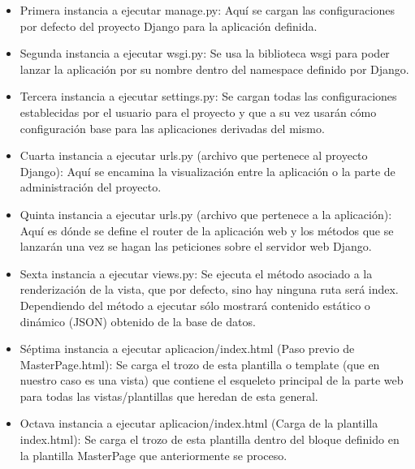 \begin{itemize}
\item Primera instancia a ejecutar manage.py: Aquí se cargan las configuraciones por defecto del proyecto Django para la aplicación definida.
\item Segunda instancia a ejecutar wsgi.py: Se usa la biblioteca wsgi para poder lanzar la aplicación por su nombre dentro del namespace definido por Django.
\item Tercera instancia a ejecutar settings.py: Se cargan todas las configuraciones establecidas por el usuario para el proyecto y que a su vez usarán cómo configuración base para las aplicaciones derivadas del mismo.
\item Cuarta instancia a ejecutar urls.py (archivo que pertenece al proyecto Django): Aquí se encamina la visualización entre la aplicación o la parte de administración del proyecto.
\item Quinta instancia a ejecutar urls.py (archivo que pertenece a la aplicación): Aquí es dónde se define el router de la aplicación web y los métodos que se lanzarán una vez se hagan las peticiones sobre el servidor web Django.
\item Sexta instancia a ejecutar views.py: Se ejecuta el método asociado a la renderización de la vista, que por defecto, sino hay ninguna ruta será index. Dependiendo del método a ejecutar sólo mostrará contenido estático o dinámico (JSON) obtenido de la base de datos.
\item Séptima instancia a ejecutar aplicacion/index.html (Paso previo de MasterPage.html): Se carga el trozo de esta plantilla o template (que en nuestro caso es una vista) que contiene el esqueleto principal de la parte web para todas las vistas/plantillas que heredan de esta general.
\item Octava instancia a ejecutar aplicacion/index.html (Carga de la plantilla index.html): Se carga el trozo de esta plantilla dentro del bloque definido en la plantilla MasterPage que anteriormente se proceso.
\end{itemize}

